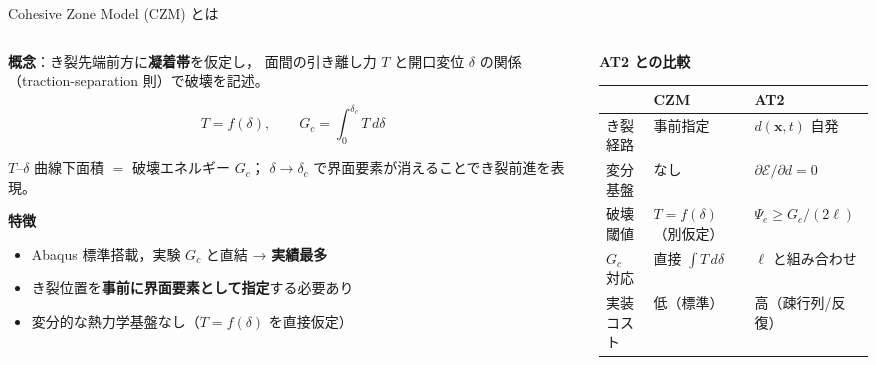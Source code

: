 \documentclass[
  ignorenonframetext,
  aspectratio=169,
]{beamer}
\begin{document}





\begin{frame}[shrink=15]{Cohesive Zone Model (CZM) とは}
\protect\hypertarget{czm-intro}{}

\begin{columns}[T]
\begin{column}{0.50\textwidth}
\textbf{概念}：き裂先端前方に\textbf{凝着帯}を仮定し，
面間の引き離し力 $T$ と開口変位 $\delta$ の関係（traction-separation 則）で破壊を記述。

\[
T = f(\delta), \qquad
G_c = \int_0^{\delta_c} T\,d\delta
\]

$T$--$\delta$ 曲線下面積 $=$ 破壊エネルギー $G_c$；
$\delta \to \delta_c$ で界面要素が消えることでき裂前進を表現。

\vspace{6pt}
\textbf{特徴}
\begin{itemize}\setlength\itemsep{2pt}
\item Abaqus 標準搭載，実験 $G_c$ と直結 → \textbf{実績最多}
\item き裂位置を\textbf{事前に界面要素として指定}する必要あり
\item 変分的な熱力学基盤なし（$T=f(\delta)$ を直接仮定）
\end{itemize}

\end{column}
\begin{column}{0.47\textwidth}
\textbf{AT2 との比較}\\[4pt]
{\footnotesize
\begin{tabular}{@{}lp{1.8cm}p{1.8cm}@{}}
\toprule
 & CZM & AT2 \\
\midrule
き裂経路 & 事前指定 & $d(\mathbf{x},t)$ 自発 \\
変分基盤 & なし & $\partial\mathcal{E}/\partial d=0$ \\
破壊閾値 & $T=f(\delta)$（別仮定） & $\Psi_e \ge G_c/(2\ell)$ \\
$G_c$ 対応 & 直接 $\int T\,d\delta$ & $\ell$ と組み合わせ \\
実装コスト & 低（標準） & 高（疎行列/反復） \\
\bottomrule
\end{tabular}
}


\end{column}
\end{columns}
\end{frame}
\end{document}
